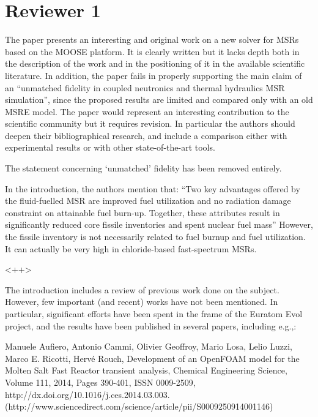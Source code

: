 \documentclass[answers,11pt]{exam}
\begin{document}
\section*{Reviewer 1}
\begin{questions}

\question The paper presents an interesting and original work on a new solver
for MSRs based on the MOOSE platform.  It is clearly written but it lacks depth
both in the description of the work and in the positioning of it in the
available scientific literature.  In addition, the paper fails in properly
supporting the main claim of an ``unmatched fidelity in coupled neutronics and
thermal hydraulics MSR simulation'', since the proposed results are limited and
compared only with an old MSRE model. The paper would represent an interesting
contribution to the scientific community but it requires revision. In
particular the authors should deepen their bibliographical research, and
include a comparison either with experimental results or with other
state-of-the-art tools.
\begin{solution}
        The statement concerning `unmatched' fidelity has been removed 
        entirely.
\end{solution}


\question <++>



\question In the introduction, the authors mention that:
``Two key advantages offered by the fluid-fuelled MSR are improved fuel 
        utilization and no radiation damage constraint on attainable fuel 
        burn-up. Together, these attributes result in significantly reduced 
        core fissile inventories and spent nuclear fuel mass''
However, the fissile inventory is not necessarily related to fuel burnup and fuel utilization. It can actually be  very high in chloride-based fast-spectrum MSRs.
\begin{solution}
        <++>
\end{solution}

\question The introduction includes a review of previous work done on the subject. However, few important (and recent) works have not been mentioned. In particular, significant efforts have been spent in the frame of the Euratom Evol project, and the results have been published in several papers, including e.g.,:

Manuele Aufiero, Antonio Cammi, Olivier Geoffroy, Mario Losa, Lelio Luzzi, Marco E. Ricotti, Hervé Rouch, Development of an OpenFOAM model for the Molten Salt Fast Reactor transient analysis, Chemical Engineering Science, Volume 111, 2014, Pages 390-401, ISSN 0009-2509, http://dx.doi.org/10.1016/j.ces.2014.03.003.
(http://www.sciencedirect.com/science/article/pii/S0009250914001146)


\end{questions}
\end{document}
